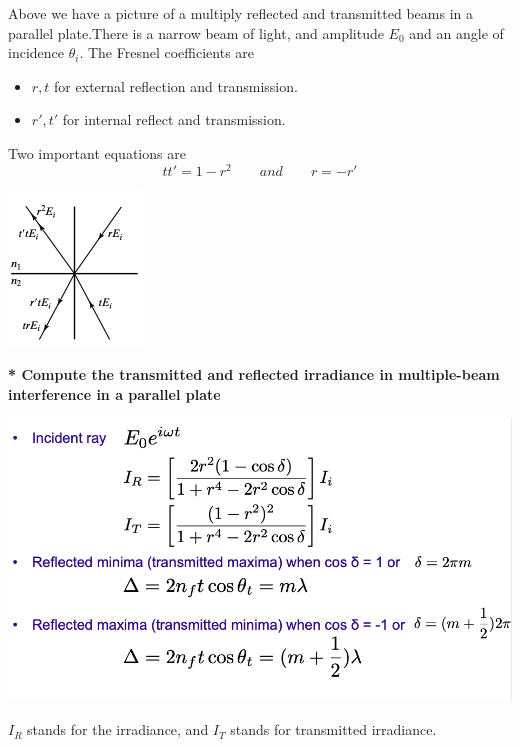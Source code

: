 \documentclass[10pt]{article}
\newcommand*{\lo}[1]{
    \textbf{* #1} \newline
}
\begin{document}
Above we have a picture of a multiply reflected and transmitted beams in a parallel plate.There is a narrow beam of light, and amplitude $E_0$ and an angle of incidence $\theta_i$. The Fresnel coefficients are 
\begin{itemize}
    \item $r, t$ for external reflection and transmission.
    \item $r', t'$ for internal reflect and transmission.
\end{itemize}

Two important equations are 
\[tt' = 1 - r^2 \qquad and \qquad r = -r'\]

\begin{center}
    \includegraphics*[scale = .7]{imgs/stokes-relation.png}
\end{center}

\newpage

\lo{Compute the transmitted and reflected irradiance in multiple-beam interference in a parallel plate}

\begin{center}
    \includegraphics*[scale = .5]{imgs/multibeam-eqs.png}
\end{center}

$I_R$ stands for the irradiance, and $I_T$ stands for transmitted irradiance.

\newblock
\end{document}
